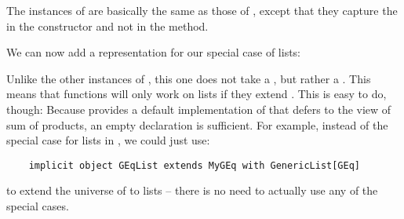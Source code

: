 The instances of  are basically the same as those of , except
that they capture the  in the constructor and not in the
method.



We can now add a representation for our special case of lists:



Unlike the other instances of , this one does not take a ,
but rather a . This means that functions will only work on
lists if they extend . This is easy to do, though: Because
 provides a default implementation of  that defers to
the view of sum of products, an empty declaration is sufficient. For example,
instead of the special case for lists in , we could just use:
\begin{lstlisting}
    implicit object GEqList extends MyGEq with GenericList[GEq]
\end{lstlisting}
to extend the universe of  to lists -- there is no need to actually use any
of the special cases.
